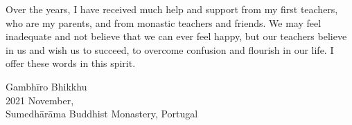 Over the years, I have received much help and support from my first
teachers, who are my parents, and from monastic teachers and friends. We
may feel inadequate and not believe that we can ever feel happy, but our
teachers believe in us and wish us to succeed, to overcome confusion and
flourish in our life. I offer these words in this spirit.

\bigskip

\enlargethispage*{3\baselineskip}

{\raggedleft
Gambhīro Bhikkhu\\
2021 November,\\
Sumedhārāma Buddhist Monastery, Portugal
\par}
